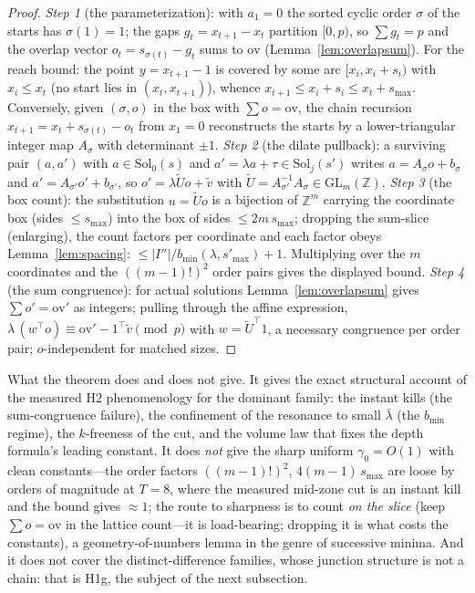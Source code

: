 \documentclass[11pt,a4paper]{article}
\numberwithin{equation}{section}
\theoremstyle{plain}
\theoremstyle{definition}
\theoremstyle{remark}
\newcommand{\Z}{\mathbb{Z}}
\begin{document}
\begin{proof}
\emph{Step 1} (the parameterization): with $a_1=0$ the sorted cyclic
order $\sigma$ of the starts has $\sigma(1)=1$; the gaps
$g_t=x_{t+1}-x_t$ partition $[0,p)$, so $\sum g_t=p$ and the overlap
vector $o_t=s_{\sigma(t)}-g_t$ sums to $\mathrm{ov}$
(Lemma~\ref{lem:overlapsum}). For the reach bound: the point
$y=x_{t+1}-1$ is covered by some arc $[x_i,x_i+s_i)$ with
$x_i\le x_t$ (no start lies in $(x_t,x_{t+1})$), whence
$x_{t+1}\le x_i+s_i\le x_t+s_{\max}$. Conversely, given $(\sigma,o)$ in
the box with $\sum o=\mathrm{ov}$, the chain recursion
$x_{t+1}=x_t+s_{\sigma(t)}-o_t$ from $x_1=0$ reconstructs the starts
by a lower-triangular integer map $A_\sigma$ with determinant $\pm1$.
\emph{Step 2} (the dilate pullback): a surviving pair
$(a,a')$ with $a\in\mathrm{Sol}_0(s)$ and
$a'=\lambda a+\tau\in\mathrm{Sol}_j(s')$ writes
$a=A_\sigma o+b_\sigma$ and $a'=A_{\sigma'}o'+b_{\sigma'}$, so
$o'=\lambda\tilde U o+\tilde v$ with $\tilde U=A_{\sigma'}^{-1}A_\sigma
\in\mathrm{GL}_m(\Z)$.
\emph{Step 3} (the box count): the substitution $u=\tilde Uo$ is a
bijection of $\Z^m$ carrying the coordinate box (sides $\le s_{\max}$)
into the box of sides $\le 2m\,s_{\max}$; dropping the sum-slice
(enlarging), the count factors per coordinate and each factor obeys
Lemma~\ref{lem:spacing}: $\le|I''|/b_{\min}(\lambda,s'_{\max})+1$.
Multiplying over the $m$ coordinates and the $((m-1)!)^2$ order pairs
gives the displayed bound.
\emph{Step 4} (the sum congruence): for actual solutions
Lemma~\ref{lem:overlapsum} gives $\sum o'=\mathrm{ov}'$ as integers;
pulling through the affine expression,
$\lambda\,(w^\top o)\equiv\mathrm{ov}'-1^\top\tilde v\pmod p$ with
$w=\tilde U^\top 1$, a necessary congruence per order pair;
$o$-independent for matched sizes.
\end{proof}

What the theorem does and does not give. It gives the exact structural
account of the measured H2 phenomenology for the dominant family: the
instant kills (the sum-congruence failure), the confinement of the
resonance to small $\bar\lambda$ (the $b_{\min}$ regime), the
$k$-freeness of the cut, and the volume law that fixes the depth
formula's leading constant. It does \emph{not} give the sharp uniform
$\gamma_0=O(1)$ with clean constants---the order factors
$((m-1)!)^2$, $4(m-1)\,s_{\max}$ are loose by orders of magnitude at $T=8$,
where the measured mid-zone cut is an instant kill and the bound gives
$\approx1$; the route to sharpness is to count \emph{on the slice}
(keep $\sum o=\mathrm{ov}$ in the lattice count---it is load-bearing;
dropping it is what costs the constants), a geometry-of-numbers lemma
in the genre of successive minima. And it does not cover the
distinct-difference families, whose junction structure is not a chain:
that is H1g, the subject of the next subsection.
\end{document}
